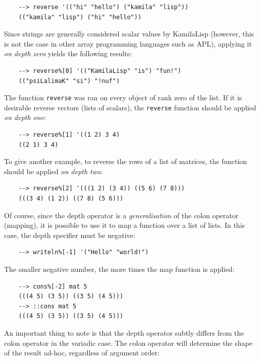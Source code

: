 \begin{Verbatim}
    --> reverse '(("hi" "hello") ("kamila" "lisp"))
    (("kamila" "lisp") ("hi" "hello"))
\end{Verbatim}

Since strings are generally considered scalar values by KamilaLisp (however, this is not the case in other array programming languages such as APL), applying it \textit{on depth zero} yields the following results:

\begin{Verbatim}
    --> reverse%[0] '(("KamilaLisp" "is") "fun!")
    (("psiLalimaK" "si") "!nuf")
\end{Verbatim}

The function \verb|reverse| was ran on every object of rank zero of the list. If it is desirable reverse vectors (lists of scalars), the \verb|reverse| function should be applied \textit{on depth one}:

\begin{Verbatim}
    --> reverse%[1] '((1 2) 3 4)
    ((2 1) 3 4)
\end{Verbatim}

To give another example, to reverse the rows of a list of matrices, the function should be applied \textit{on depth two}:

\begin{Verbatim}
    --> reverse%[2] '(((1 2) (3 4)) ((5 6) (7 8)))
    (((3 4) (1 2)) ((7 8) (5 6)))
\end{Verbatim}

Of course, since the depth operator is a \textit{generalisation} of the colon operator (mapping), it is possible to use it to map a function over a list of lists. In this case, the depth specifier must be negative:

\begin{Verbatim}
    --> writeln%[-1] '("Hello" "world!")
\end{Verbatim}

The smaller negative number, the more times the map function is applied:

\begin{Verbatim}
    --> cons%[-2] mat 5
    (((4 5) (3 5)) ((3 5) (4 5)))
    --> ::cons mat 5
    (((4 5) (3 5)) ((3 5) (4 5)))
\end{Verbatim}

An important thing to note is that the depth operator subtly differs from the colon operator in the variadic case. The colon operator will determine the shape of the result ad-hoc, regardless of argument order:

